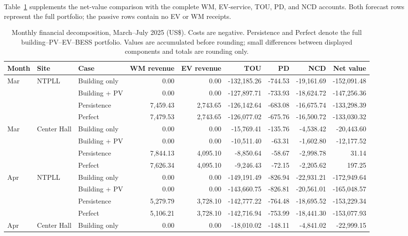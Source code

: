 \documentclass[final,5p,times]{elsarticle}
\begin{document}
Table~\ref{tab:site_monthly_decomposition} supplements the net-value comparison
with the complete WM, EV-service, TOU, PD, and NCD accounts. Both forecast
rows represent the full portfolio; the passive rows contain no EV or WM receipts.
\begin{table}[!t]
\centering
\caption{Monthly financial decomposition, March--July 2025 (US\$). Costs are negative. Persistence and Perfect denote the full building--PV--EV--BESS portfolio. Values are accumulated before rounding; small differences between displayed components and totals are rounding only.}
\label{tab:site_monthly_decomposition}
\footnotesize
\setlength{\tabcolsep}{3pt}
\begin{tabular}{@{}lllrrrrrr@{}}
\toprule
Month & Site & Case & WM revenue & EV revenue & TOU & PD & NCD & Net value\\
\midrule
Mar & NTPLL & Building only & 0.00 & 0.00 & -132,185.26 & -744.53 & -19,161.69 & -152,091.48 \\
 &  & Building + PV & 0.00 & 0.00 & -127,897.71 & -733.93 & -18,624.72 & -147,256.36 \\
 &  & Persistence & 7,459.43 & 2,743.65 & -126,142.64 & -683.08 & -16,675.74 & -133,298.39 \\
 &  & Perfect & 7,479.53 & 2,743.65 & -126,077.02 & -675.76 & -16,500.72 & -133,030.32 \\
\addlinespace[2pt]
Mar & Center Hall & Building only & 0.00 & 0.00 & -15,769.41 & -135.76 & -4,538.42 & -20,443.60 \\
 &  & Building + PV & 0.00 & 0.00 & -10,511.40 & -63.31 & -1,602.80 & -12,177.52 \\
 &  & Persistence & 7,844.13 & 4,095.10 & -8,850.64 & -58.67 & -2,998.78 & 31.14 \\
 &  & Perfect & 7,626.34 & 4,095.10 & -9,246.43 & -72.15 & -2,205.62 & 197.25 \\
\addlinespace[2pt]
Apr & NTPLL & Building only & 0.00 & 0.00 & -149,191.49 & -826.94 & -22,931.21 & -172,949.64 \\
 &  & Building + PV & 0.00 & 0.00 & -143,660.75 & -826.81 & -20,561.01 & -165,048.57 \\
 &  & Persistence & 5,279.79 & 3,728.10 & -142,777.22 & -764.48 & -18,695.52 & -153,229.34 \\
 &  & Perfect & 5,106.21 & 3,728.10 & -142,716.94 & -753.99 & -18,441.30 & -153,077.93 \\
\addlinespace[2pt]
Apr & Center Hall & Building only & 0.00 & 0.00 & -18,010.02 & -148.11 & -4,841.02 & -22,999.15 \\

\end{tabular}
\end{table}
\end{document}
